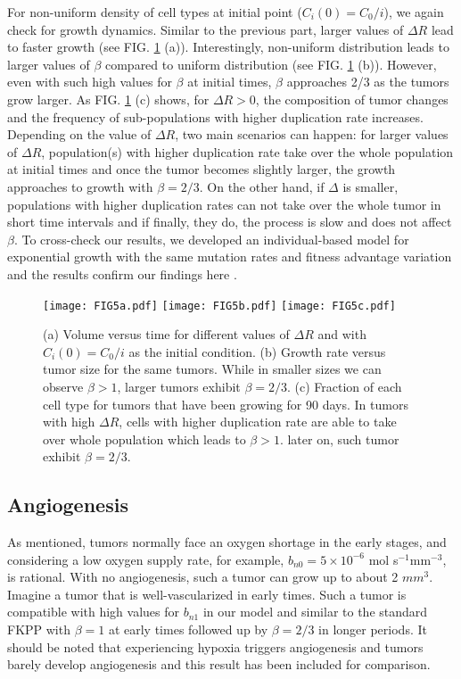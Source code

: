 \documentclass[aps,prl, superscriptaddress,groupedaddress]{revtex4}  %
\begin{document}
  For non-uniform density of cell types at initial point ($C_i (0)= C_0/i$), we again check for growth dynamics. Similar to the previous part, larger values of $\Delta R$ lead to faster growth (see FIG. \ref{FIG5} (a)). Interestingly, non-uniform distribution leads to larger values of $\beta$ compared to uniform distribution (see FIG. \ref{FIG5} (b)). However, even with such high values for $\beta$ at initial times, $\beta$ approaches 2/3 as the tumors grow larger. As FIG. \ref{FIG5} (c) shows, for $\Delta R>0$, the composition of tumor changes and the frequency of sub-populations with higher duplication rate increases. Depending on the value of $\Delta R$, two main scenarios can happen: for larger values of $\Delta R$, population(s) with higher duplication rate take over the whole population at initial times and once the tumor becomes slightly larger, the growth approaches to growth with $\beta=2/3$. On the other hand, if $\Delta$ is smaller, populations with higher duplication rates can not take over the whole tumor in short time intervals and if finally, they do, the process is slow and does not affect $\beta$. To cross-check our results, we developed an individual-based model for exponential growth with the same mutation rates and fitness advantage variation and the results confirm our findings here \cite{supplemtal}. 
	
	\begin{figure} 
		\centering
		\texttt{[image: FIG5a.pdf]}  
		\texttt{[image: FIG5b.pdf]}
		\texttt{[image: FIG5c.pdf]} 
		\caption{ (a) Volume versus time for different values of $\Delta R$ and with $C_i(0)=C_0/i$ as the initial condition. (b) Growth rate versus tumor size for the same tumors.  While in smaller sizes we can observe $\beta>1$, larger tumors exhibit $\beta=2/3$. (c) Fraction of each cell type for tumors that have been growing for 90 days. In tumors with high $\Delta R $, cells with higher duplication rate are able to take over whole population which leads to $\beta>1$. later on, such tumor exhibit $\beta=2/3$. }
		\label{FIG5}
	\end{figure} 
	
	\subsection{Angiogenesis}   
	As mentioned, tumors normally face an oxygen shortage in the early stages, and considering a low oxygen supply rate, for example, $b_{n0}=5\times 10^{-6}$ mol s$^{-1}$mm$^{-3}$, is rational. With no angiogenesis, such a tumor can grow up to about 2 $mm^3$. Imagine a tumor that is well-vascularized in early times. Such a tumor is compatible with high values for $b_{n1}$ in our model and similar to the standard FKPP with $\beta=1$ at early times followed up by $\beta=2/3$ in longer periods. It should be noted that experiencing hypoxia triggers angiogenesis and tumors barely develop angiogenesis and this result has been included for comparison.
	
\end{document}
